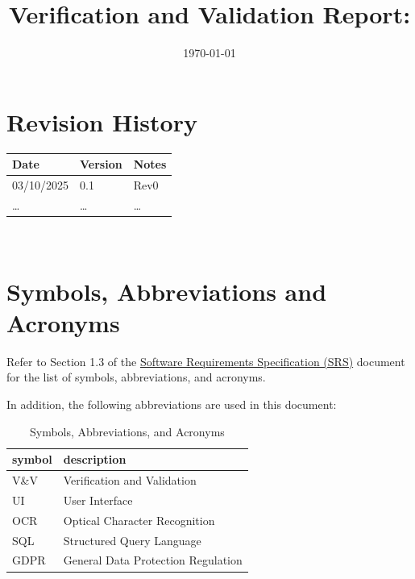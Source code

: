 \documentclass[12pt, titlepage]{article}
\begin{document}
\title{Verification and Validation Report: \progname} 
\author{\authname}
\date{\today}
	
\maketitle


\section{Revision History}

\begin{tabularx}{\textwidth}{p{3cm}p{2cm}X}
\toprule {\bf Date} & {\bf Version} & {\bf Notes}\\
\midrule
03/10/2025 & 0.1 & Rev0\\
\ldots & \ldots & \ldots\\
\bottomrule
\end{tabularx}

~\newpage

\section{Symbols, Abbreviations and Acronyms}


Refer to Section 1.3 of the
\href{https://github.com/PlutosCapstone/Plutos/blob/main/docs/SRS/SRS.pdf}{Software
Requirements Specification (SRS)} document for the list of symbols,
abbreviations, and acronyms.


In addition, the following abbreviations are used in this document:\\

\renewcommand{\arraystretch}{1.2}
\begin{table}[h!]
\caption{Symbols, Abbreviations, and Acronyms}
\begin{tabularx}{\textwidth}{l l}
  \toprule		
  \textbf{symbol} & \textbf{description}\\
  \midrule 
  V\&V & Verification and Validation\\
  UI & User Interface\\
  OCR & Optical Character Recognition\\
  SQL & Structured Query Language\\
  GDPR & General Data Protection Regulation\\
  \bottomrule
\end{tabularx}
\end{table}
\end{document}
